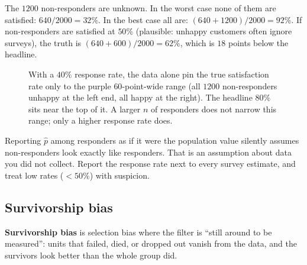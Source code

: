 The $1200$ non-responders are unknown. In the worst case none of them are satisfied:
$640/2000 = 32\%$. In the best case all are: $(640+1200)/2000 = 92\%$. If non-responders
are satisfied at $50\%$ (plausible: unhappy customers often ignore surveys), the truth is
$(640 + 600)/2000 = 62\%$, which is $18$ points below the headline.

\begin{figure}[H]
\centering
{}
\caption{With a $40\%$ response rate, the data alone pin the true satisfaction rate only
to the purple $60$-point-wide range (all $1200$ non-responders unhappy at the left end,
all happy at the right). The headline $80\%$ sits near the top of it. A larger $n$ of
responders does not narrow this range; only a higher response rate does.}
\label{fig:sampling-nonresponse}
\end{figure}

\begin{trapbox}
Reporting $\hat p$ among responders as if it were the population value silently assumes
non-responders look exactly like responders. That is an assumption about data you did
not collect. Report the response rate next to every survey estimate, and treat low rates
($<50\%$) with suspicion.
\end{trapbox}

\subsection{Survivorship bias}

\textbf{Survivorship bias} is selection bias where the filter is ``still around to be
measured'': units that failed, died, or dropped out vanish from the data, and the
survivors look better than the whole group did.

